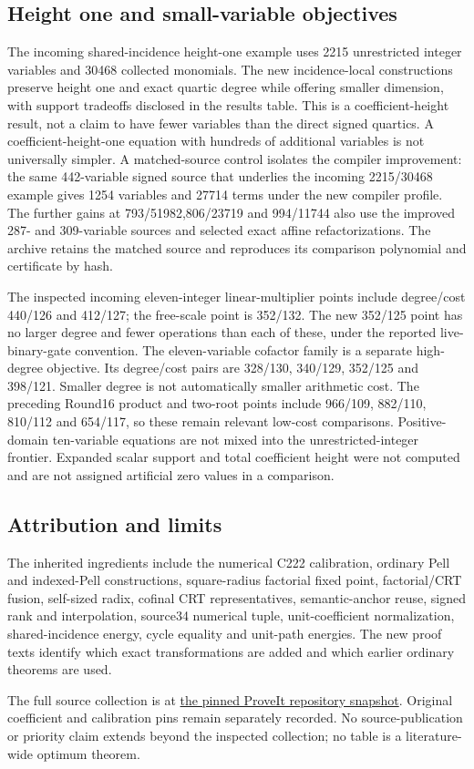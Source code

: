 \subsection{Height one and small-variable objectives}
The incoming shared-incidence height-one example uses 2215 unrestricted integer variables and 30468 collected monomials. The new incidence-local constructions preserve height one and exact quartic degree while offering smaller dimension, with support tradeoffs disclosed in the results table. This is a coefficient-height result, not a claim to have fewer variables than the direct signed quartics. A coefficient-height-one equation with hundreds of additional variables is not universally simpler. A matched-source control isolates the compiler improvement: the same 442-variable signed source that underlies the incoming 2215/30468 example gives 1254 variables and 27714 terms under the new compiler profile. The further gains at 793/51982,806/23719 and 994/11744 also use the improved 287- and 309-variable sources and selected exact affine refactorizations. The archive retains the matched source and reproduces its comparison polynomial and certificate by hash.

The inspected incoming eleven-integer linear-multiplier points include degree/cost 440/126 and 412/127; the free-scale point is 352/132. The new 352/125 point has no larger degree and fewer operations than each of these, under the reported live-binary-gate convention. The eleven-variable cofactor family is a separate high-degree objective. Its degree/cost pairs are 328/130, 340/129, 352/125 and 398/121. Smaller degree is not automatically smaller arithmetic cost. The preceding Round16 product and two-root points include 966/109, 882/110, 810/112 and 654/117, so these remain relevant low-cost comparisons. Positive-domain ten-variable equations are not mixed into the unrestricted-integer frontier. Expanded scalar support and total coefficient height were not computed and are not assigned artificial zero values in a comparison.

\subsection{Attribution and limits}
The inherited ingredients include the numerical C222 calibration, ordinary Pell and indexed-Pell constructions, square-radius factorial fixed point, factorial/CRT fusion, self-sized radix, cofinal CRT representatives, semantic-anchor reuse, signed rank and interpolation, source34 numerical tuple, unit-coefficient normalization, shared-incidence energy, cycle equality and unit-path energies. The new proof texts identify which exact transformations are added and which earlier ordinary theorems are used.

The full source collection is at \href{https://github.com/VladimirReshetnikov/ProveIt/tree/1c5367452a0bd4dd7e9e4bceb1508b62dbd2ff61}{the pinned ProveIt repository snapshot}. Original coefficient and calibration pins remain separately recorded. No source-publication or priority claim extends beyond the inspected collection; no table is a literature-wide optimum theorem.
